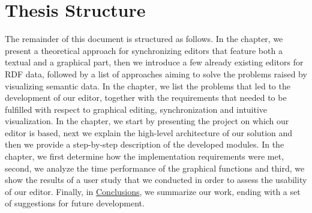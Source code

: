 \section {Thesis Structure}

The remainder of this document is structured as follows. In the  chapter, we present a theoretical approach for synchronizing editors that feature both a textual and a graphical part, then we introduce a few already existing editors for RDF data, followed by a list of approaches aiming to solve the problems raised by visualizing semantic data. In the  chapter, we list the problems that led to the development of our editor, together with the requirements that needed to be fulfilled with respect to graphical editing, synchronization and intuitive visualization. In the  chapter, we start by presenting the project on which our editor is based, next we explain the high-level architecture of our solution and then we provide a step-by-step description of the developed modules. In the  chapter, we first determine how the implementation requirements were met, second, we analyze the time performance of the graphical functions and third, we show the results of a user study that we conducted in order to assess the usability of our editor. Finally, in \hyperref[ch:conclusions]{Conclusions}, we summarize our work, ending with a set of suggestions for future development.








